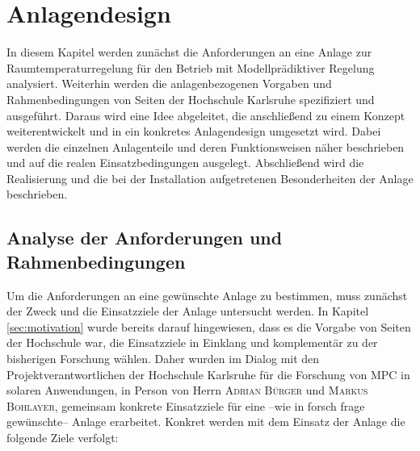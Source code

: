 %
%

\renewcommand{\chapterheadstartvskip}{\vspace*{2cm}}

\chapter{Anlagendesign}
\label{chap:anlagendesign}

\renewcommand{\chapterheadstartvskip}{\vspace*{-0.5cm}}

In diesem Kapitel werden zunächst die Anforderungen an eine Anlage zur Raumtemperaturregelung für den Betrieb mit Modellprädiktiver Regelung analysiert. Weiterhin werden die anlagenbezogenen Vorgaben und Rahmenbedingungen von Seiten der Hochschule Karlsruhe spezifiziert und ausgeführt. Daraus wird eine Idee abgeleitet, die anschließend zu einem Konzept weiterentwickelt und in ein konkretes Anlagendesign umgesetzt wird. Dabei werden die einzelnen Anlagenteile und deren Funktionsweisen näher beschrieben und auf die realen Einsatzbedingungen ausgelegt. 
Abschließend wird die Realisierung und die bei der Installation aufgetretenen Besonderheiten der Anlage beschrieben.


\section{Analyse der Anforderungen und Rahmenbedingungen}
\label{sec:anforderungen}

Um die Anforderungen an eine gewünschte Anlage zu bestimmen, muss zunächst der Zweck und die Einsatzziele der Anlage untersucht werden. In Kapitel \ref{sec:motivation} wurde bereits darauf hingewiesen, dass es die Vorgabe von Seiten der Hochschule war, die Einsatzziele in Einklang und komplementär zu der bisherigen Forschung wählen. Daher wurden im Dialog mit den Projektverantwortlichen der Hochschule Karlsruhe für die Forschung von MPC in solaren Anwendungen, in Person von Herrn \textsc{Adrian Bürger} und \textsc{Markus Bohlayer}, gemeinsam konkrete Einsatzziele für eine --wie in forsch frage gewünschte-- Anlage erarbeitet. Konkret werden mit dem Einsatz der Anlage die folgende Ziele verfolgt:
 
